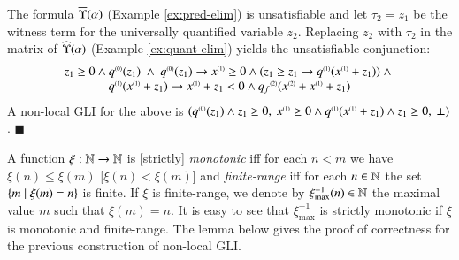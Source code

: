 
\begin{example}\label{ex:gli}
The formula $\overline{\Upsilon}({\alpha})$ (Example \ref{ex:pred-elim}) is
unsatisfiable and let $\tau_2 = z_1$ be the witness term for the
universally quantified variable $z_2$. Replacing $z_2$ with $\tau_2$
in the matrix of $\widehat{\Upsilon}({\alpha})$ (Example \ref{ex:quant-elim})
yields the unsatisfiable conjunction: 
\vspace*{-\baselineskip}
\[\begin{array}{c}
z_1 \geq 0 \wedge {q}^{\scriptscriptstyle{({0})}}(z_1)  ~\wedge~
{q}^{\scriptscriptstyle{({0})}}(z_1) \rightarrow {x}^{\scriptscriptstyle{({1})}} \geq 0 \wedge (z_1 \geq z_1 \rightarrow {q}^{\scriptscriptstyle{({1})}}({x}^{\scriptscriptstyle{({1})}}+z_1)) ~\wedge~ \\
{q}^{\scriptscriptstyle{({1})}}({x}^{\scriptscriptstyle{({1})}}+z_1) \rightarrow {x}^{\scriptscriptstyle{({1})}}+z_1 < 0 \wedge {q_f}^{\scriptscriptstyle{({2})}}({x}^{\scriptscriptstyle{({2})}}+{x}^{\scriptscriptstyle{({1})}}+z_1)
\end{array}\]
A non-local GLI for the above is $({q}^{\scriptscriptstyle{({0})}}(z_1) \wedge
z_1\geq 0,~ {x}^{\scriptscriptstyle{({1})}} \geq 0 \wedge {q}^{\scriptscriptstyle{({1})}}({x}^{\scriptscriptstyle{({1})}}+z_1)
\wedge z_1\geq0,~\bot)$. \hfill$\blacksquare$
\end{example}

A function $\xi : {\bf \mathbb{N}} \rightarrow {\bf \mathbb{N}}$ is [strictly]
\emph{monotonic} iff for each $n < m$ we have $\xi(n) \leq \xi(m)$
     [$\xi(n) < \xi(m)$] and \emph{finite-range} iff for each $n \in
     {\bf \mathbb{N}}$ the set $\{ m \mid \xi(m)=n \}$ is finite. If $\xi$ is
     finite-range, we denote by $\xi_{\max}^{-1}(n) \in {\bf \mathbb{N}}$ the
     maximal value $m$ such that $\xi(m)=n$. It is easy to see that
     $\xi_{\max}^{-1}$ is strictly monotonic if $\xi$ is monotonic and
     finite-range. The lemma below gives the proof of correctness for
     the previous construction of non-local GLI.

